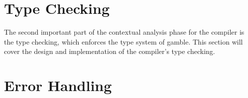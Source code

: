 \section{Type Checking}
The second important part of the contextual analysis phase for the compiler is the type checking, which enforces the type system of \gls{gamble}.
This section will cover the design and implementation of the compiler's type checking.


\section{Error Handling}
